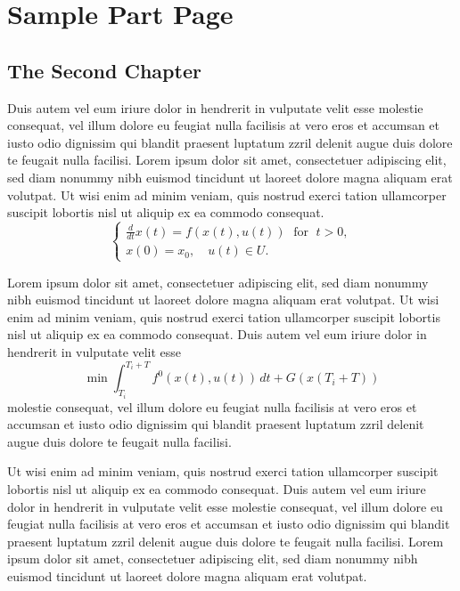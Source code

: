 \documentclass[oldfontcommands,6x9]{pupbook}
\begin{document}
\part{Sample Part Page}


\chapter{The Second Chapter}

Duis autem vel eum iriure dolor in hendrerit in vulputate velit esse
molestie consequat, vel illum dolore eu feugiat nulla facilisis at vero
eros et accumsan et iusto odio dignissim qui blandit praesent luptatum
zzril delenit augue duis dolore te feugait nulla facilisi. Lorem ipsum
dolor sit amet, consectetuer adipiscing elit, sed diam nonummy nibh
euismod tincidunt ut laoreet dolore magna aliquam erat volutpat. Ut wisi
enim ad minim veniam, quis nostrud exerci tation ullamcorper suscipit
lobortis nisl ut aliquip ex ea commodo consequat. 
\begin{equation} \label{eq1.2}
\left\{
\begin{array}{ll}
\frac{d}{dt} x(t) = f(x(t), u(t))\; \mbox{ for }\; t > 0, \\
x(0) = x_0, \quad u(t) \in U.
\end{array}
\right.
\end{equation}

Lorem ipsum dolor sit amet, consectetuer adipiscing elit, sed diam
nonummy nibh euismod tincidunt ut laoreet dolore magna aliquam erat
volutpat. Ut wisi enim ad minim veniam, quis nostrud exerci tation
ullamcorper suscipit lobortis nisl ut aliquip ex ea commodo consequat.
Duis autem vel eum iriure dolor in hendrerit in vulputate velit esse
\begin{equation} \label{eq1.4}
\min \int^{T_i + T}_{T_i} f^0 (x(t), u(t))\,dt + G(x (T_i + T))
\end{equation}
molestie consequat, vel illum dolore eu feugiat nulla facilisis at vero
eros et accumsan et iusto odio dignissim qui blandit praesent luptatum
zzril delenit augue duis dolore te feugait nulla facilisi. 

Ut wisi enim ad minim veniam, quis nostrud exerci tation ullamcorper
suscipit lobortis nisl ut aliquip ex ea commodo consequat. Duis autem
vel eum iriure dolor in hendrerit in vulputate velit esse molestie
consequat, vel illum dolore eu feugiat nulla facilisis at vero eros et
accumsan et iusto odio dignissim qui blandit praesent luptatum zzril
delenit augue duis dolore te feugait nulla facilisi. Lorem ipsum dolor
sit amet, consectetuer adipiscing elit, sed diam nonummy nibh euismod
tincidunt ut laoreet dolore magna aliquam erat volutpat. 
\end{document}
